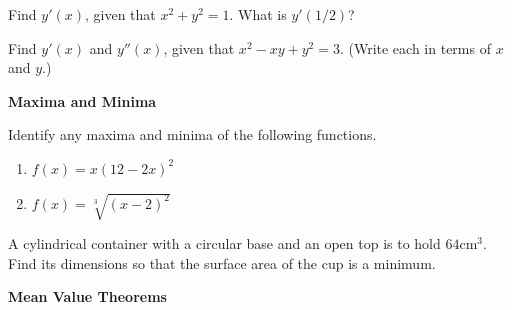 \begin{Exercise}
  \label{exercise tangent circle}
  Find $y'(x)$, given that $x^2 + y^2 = 1$.  What is $y'(1/2)$?

\end{Exercise}





\begin{Exercise}
  \label{exercise y' y'' circle}
  Find $y'(x)$ and $y''(x)$, given that $x^2 - x y + y^2 = 3$.
  (Write each in terms of $x$ and $y$.)

\end{Exercise}



\begin{large}
  \noindent
  \textbf{Maxima and Minima}
\end{large}


\begin{Exercise}
  \label{exercise max min x(12-2x)2}
  Identify any maxima and minima of the following functions.
  \renewcommand{\theenumi}{\alph{enumi}}
  \begin{enumerate}
  \item
    $\displaystyle f(x) = x(12-2x)^2$
  \item
    $\displaystyle f(x) = \sqrt[3]{(x-2)^2}$
  \end{enumerate}
  \renewcommand{\theenumi}{\arabic{enumi}}

\end{Exercise}




\begin{Exercise}
  \label{exercise surface area cup}
  A cylindrical container with a circular base and an open top is to hold
  $64 \mathrm{cm}^3$.  Find its dimensions so that the surface area of the 
  cup is a minimum.

\end{Exercise}



\begin{large}
  \noindent
  \textbf{Mean Value Theorems}
\end{large}


